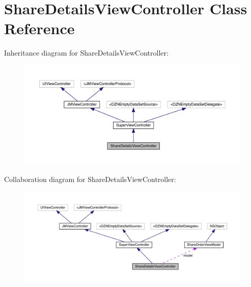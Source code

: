 \hypertarget{interface_share_details_view_controller}{}\section{Share\+Details\+View\+Controller Class Reference}
\label{interface_share_details_view_controller}


Inheritance diagram for Share\+Details\+View\+Controller\+:\nopagebreak
\begin{figure}[H]
\begin{center}
\leavevmode
\includegraphics[width=350pt]{interface_share_details_view_controller__inherit__graph}
\end{center}
\end{figure}


Collaboration diagram for Share\+Details\+View\+Controller\+:\nopagebreak
\begin{figure}[H]
\begin{center}
\leavevmode
\includegraphics[width=350pt]{interface_share_details_view_controller__coll__graph}
\end{center}
\end{figure}
